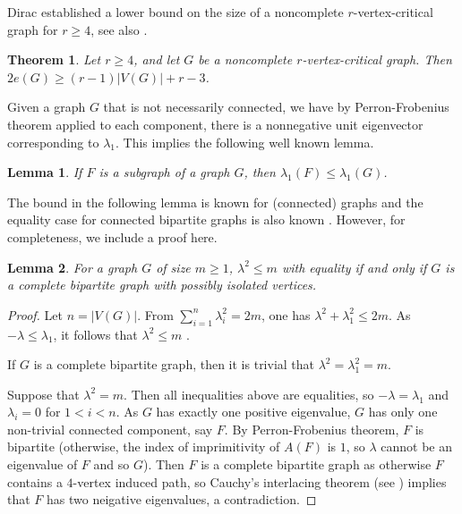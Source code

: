 \documentclass[10pt,a4paper]{amsart}
\newtheorem{theorem}{Theorem}%
\newtheorem{lemma}{Lemma}[section]
\begin{document}
Dirac  established a lower bound  on the size of a noncomplete $r$-vertex-critical graph for $r\ge 4$, see also \cite{BernshteynKostochka}.

\begin{theorem}\label{thm:dirac} \cite[Theorem 15]{Dirac}
Let $r\ge 4$, and let $G$ be a noncomplete $r$-vertex-critical graph. Then
$2e(G)\ge (r-1)|V(G)|+r-3$.
\end{theorem}

Given a graph $G$ that is not necessarily connected, we have by Perron-Frobenius theorem applied to each component, there is a nonnegative unit eigenvector corresponding to $\lambda_1$.
This implies the following well known lemma.

\begin{lemma}\label{subgraph}
If $F$ is a subgraph of a graph $G$, then $\lambda_1(F)\le \lambda_1(G)$.
\end{lemma}

The bound in the following lemma is known for (connected) graphs \cite{Powers}  and the equality case for connected bipartite graphs is also known \cite{HS}. However, for completeness, we include a proof here.


\begin{lemma} \label{BIS}
For a graph $G$ of size $m\ge 1$, $\lambda^2\le m$ with equality if and only if $G$ is a complete bipartite graph with possibly isolated vertices.
\end{lemma}

\begin{proof} 
Let $n=|V(G)|$. From $\sum_{i=1}^n\lambda_i^2=2m$, one has $\lambda^2+\lambda_1^2\le 2m$. As $-\lambda \le \lambda_1$, it follows that $\lambda^2\le m$ \cite{Powers}.

If $G$ is a complete bipartite graph, then it is trivial that  $\lambda^2=\lambda_1^2=m$.

Suppose that $\lambda^2=m$. Then all inequalities above are equalities, so $-\lambda=\lambda_1$ and $\lambda_i=0$ for $1<i<n$. As $G$ has exactly one positive eigenvalue, $G$ has only one non-trivial connected component, say $F$. By Perron-Frobenius theorem, $F$ is bipartite (otherwise, the index of imprimitivity of $A(F)$ is $1$, so $\lambda$ cannot be an eigenvalue of $F$ and so $G$). 
Then $F$ is a complete bipartite graph as otherwise $F$ contains a $4$-vertex induced path, so Cauchy's interlacing theorem (see \cite[Theorem 0.10]{CDS}) implies that  $F$ has two neigative eigenvalues, a contradiction.
\end{proof}
\end{document}
